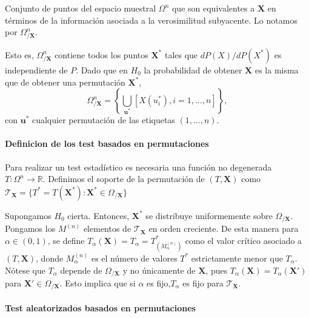 \begin{definicion}
	Conjunto de puntos del espacio muestral $\Omega^n$ que 
son equivalentes a $\mathbf{X}$ en términos de la información 
asociada a la verosimilitud subyacente. Lo notamos por 
$\Omega^n_{/\mathbf{X}}$.
\end{definicion}

	Esto es, $\Omega^n_{/\mathbf{X}}$ contiene todos los 
puntos $\mathbf{X}^*$ tales que $dP(X)/dP(X^*)$ es 
independiente de $P$. Dado que en $H_0$ la probabilidad de 
obtener $\mathbf{X}$ es la misma que de obtener una 
permutación $\mathbf{X}^*$,
	\[ 
		\Omega^n_{/\mathbf{X}} = 
			\left\lbrace
				\underset{\mathbf{u}^*}{\bigcup}
					[ X(u_i^*), i = 1, \dots, n ]
			\right\rbrace ,
	\]
	con $\mathbf{u}^*$ cualquier permutación de las etiquetas 
$(1, \dots, n)$.

\paragraph{Definicion de los test basados en permutaciones}
\begin{definicion}
	Para realizar un test estadístico es necesaria una 
función no degenerada $T: \Omega^n \rightarrow \mathbb{R}$. 
Definimos el soporte de la permutación de $(T, \mathbf{X})$ 
como $\mathcal{T}_\mathbf{X} = \{ T^* = T(\mathbf{X}^*): 
\mathbf{X}^* \in \Omega_{/\mathbf{X}}\}$ 
\end{definicion}	

	Supongamos $H_0$ cierta. Entonces, $\mathbf{X}^*$ se 
distribuye uniformemente sobre $\Omega_{/\mathbf{X}}$. 
Pongamos los $M^{(n)}$ elementos de $\mathcal{T}_\mathbf{X}$ 
en orden creciente. De esta manera para $\alpha \in (0,1)$, 
se define $T_\alpha(\mathbf{X}) = T_\alpha = T^*_{(M^{(n)}_
\alpha)}$ como el valor crítico asociado a $(T, \mathbf{X})$, 
donde $M^{(n)}_\alpha$ es el número de valores $T^*$ 
estrictamente menor que $T_\alpha$. Nótese que $T_\alpha$ 
depende de $\Omega_{/\mathbf{X}}$ y no únicamente de $
\mathbf{X}$, pues $T_\alpha(\mathbf{X}) = T_
\alpha(\mathbf{X}')$ para $\mathbf{X}' \in \Omega_{/
\mathbf{X}}$. Esto implica que si $\alpha$ es fijo,$T_\alpha$ 
es fijo para $\mathcal{T}_\mathbf{X}$.
	
\paragraph{Test aleatorizados basados en permutaciones }

